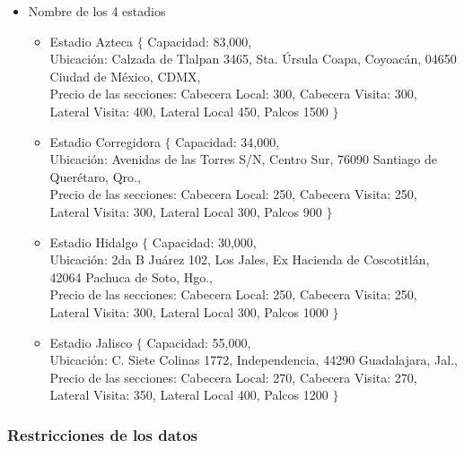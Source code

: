 \begin{itemize}
    \item Nombre de los 4 estadios
    \begin{itemize}
        \item Estadio Azteca      $\{$ Capacidad: 83,000, \\
                                       Ubicación: Calzada de Tlalpan 3465, Sta. Úrsula Coapa, Coyoacán, 04650 Ciudad de México, CDMX,\\
                                       Precio de las secciones: Cabecera Local: 300, Cabecera Visita: 300, Lateral Visita: 400, Lateral Local 450, Palcos 1500
                                  $\}$
        \item Estadio Corregidora $\{$ Capacidad: 34,000, \\
                                       Ubicación: Avenidas de las Torres S/N, Centro Sur, 76090 Santiago de Querétaro, Qro.,\\
                                       Precio de las secciones: Cabecera Local: 250, Cabecera Visita: 250, Lateral Visita: 300, Lateral Local 300, Palcos 900
                                  $\}$        
        \item Estadio Hidalgo     $\{$ Capacidad: 30,000, \\
                                       Ubicación: 2da B Juárez 102, Los Jales, Ex Hacienda de Coscotitlán, 42064 Pachuca de Soto, Hgo.,\\
                                       Precio de las secciones: Cabecera Local: 250, Cabecera Visita: 250, Lateral Visita: 300, Lateral Local 300, Palcos 1000
                                  $\}$        
        \item Estadio Jalisco     $\{$ Capacidad: 55,000, \\
                                       Ubicación: C. Siete Colinas 1772, Independencia, 44290 Guadalajara, Jal.,\\
                                       Precio de las secciones: Cabecera Local: 270, Cabecera Visita: 270, Lateral Visita: 350, Lateral Local 400, Palcos 1200
                                  $\}$           
    \end{itemize}
\end{itemize}

\subsubsection*{Restricciones de los datos}

